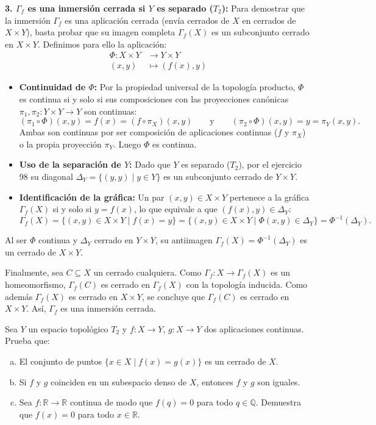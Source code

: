 \begin{sol}
\vspace{0.3cm}
\noindent\textbf{3. $\Gamma_f$ es una inmersión cerrada si $Y$ es separado ($T_2$):}
Para demostrar que la inmersión $\Gamma_f$ es una aplicación cerrada (envía cerrados de $X$ en cerrados de $X \times Y$), basta probar que su imagen completa $\Gamma_f(X)$ es un subconjunto cerrado en $X \times Y$. Definimos para ello la aplicación:
\begin{align*}
    \Phi: X \times Y &\longrightarrow Y \times Y \\
    (x, y) &\longmapsto (f(x), y)
\end{align*}
\begin{itemize}
    \item \textbf{Continuidad de $\Phi$:} Por la propiedad universal de la topología producto, $\Phi$ es continua si y solo si sus composiciones con las proyecciones canónicas $\pi_1, \pi_2: Y \times Y \to Y$ son continuas:
    \[
        (\pi_1 \circ \Phi)(x, y) = f(x) = (f \circ \pi_X)(x, y) \qquad \text{y} \qquad (\pi_2 \circ \Phi)(x, y) = y = \pi_Y(x, y).
    \]
    Ambas son continuas por ser composición de aplicaciones continuas ($f$ y $\pi_X$) o la propia proyección $\pi_Y$. Luego $\Phi$ es continua.
    \item \textbf{Uso de la separación de $Y$:} Dado que $Y$ es separado ($T_2$), por el ejercicio 98 su diagonal $\Delta_Y = \{(y, y) \mid y \in Y\}$ es un subconjunto cerrado de $Y \times Y$.
    \item \textbf{Identificación de la gráfica:} Un par $(x, y) \in X \times Y$ pertenece a la gráfica $\Gamma_f(X)$ si y solo si $y = f(x)$, lo que equivale a que $(f(x), y) \in \Delta_Y$:
    \[
        \Gamma_f(X) = \{(x, y) \in X \times Y \mid f(x) = y\} = \{(x, y) \in X \times Y \mid \Phi(x, y) \in \Delta_Y\} = \Phi^{-1}(\Delta_Y).
    \]
\end{itemize}
Al ser $\Phi$ continua y $\Delta_Y$ cerrado en $Y \times Y$, su antiimagen $\Gamma_f(X) = \Phi^{-1}(\Delta_Y)$ es un cerrado de $X \times Y$.

Finalmente, sea $C \subseteq X$ un cerrado cualquiera. Como $\Gamma_f: X \to \Gamma_f(X)$ es un homeomorfismo, $\Gamma_f(C)$ es cerrado en $\Gamma_f(X)$ con la topología inducida. Como además $\Gamma_f(X)$ es cerrado en $X \times Y$, se concluye que $\Gamma_f(C)$ es cerrado en $X \times Y$. Así, $\Gamma_f$ es una inmersión cerrada.
\end{sol}
\begin{ejer}
    [100] Sea $Y$ un espacio topológico $T_2$ y $f : X \to Y$, $g : X \to Y$ dos aplicaciones continuas. Prueba que:
    \begin{enumerate}[a)]
        \item El conjunto de puntos $\{x \in X \mid f(x) = g(x)\}$ es un cerrado de $X$.
        \item Si $f$ y $g$ coinciden en un subespacio denso de $X$, entonces $f$ y $g$ son iguales.
        \item Sea $f : \mathbb{R} \to \mathbb{R}$ continua de modo que $f(q) = 0$ para todo $q \in \mathbb{Q}$. Demuestra que $f(x) = 0$ para todo $x \in \mathbb{R}$.
    \end{enumerate}
\end{ejer}
